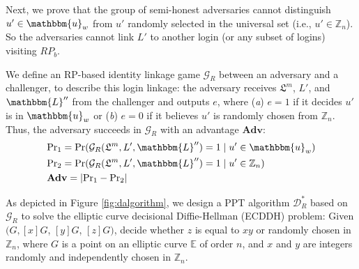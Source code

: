 Next, we prove that the group of semi-honest adversaries cannot distinguish $u' \in \mathbbm{u}_w$ from $u'$ randomly selected in the universal set (i.e., $u' \in \mathbb{Z}_n$).
So the adversaries cannot link $L'$ to another login (or any subset of logins) visiting $RP_{b}$.


We define an RP-based identity linkage game $\mathcal{G}_R$ between an adversary and a challenger, to describe this login linkage: the adversary receives $\mathfrak{L}^m$, $L'$, and $\mathbbm{L}''$ from the challenger and outputs $e$, where (\emph{a}) $e = 1$ if it decides $u'$ is in $\mathbbm{u}_w$ %
or (\emph{b}) $e=0$ if it believes $u'$ is randomly chosen from $\mathbb{Z}_n$.
Thus, the adversary succeeds in $\mathcal{G}_R$ with an advantage $\mathbf{Adv}$:
\begin{align*}
&{\rm Pr}_1={\rm Pr}(\mathcal{G}_R(\mathfrak{L}^m, L', \mathbbm{L}'')=1 \;| \; u' \in \mathbbm{u}_w)  \\
&{\rm Pr}_2={\rm Pr}(\mathcal{G}_R(\mathfrak{L}^m, L', \mathbbm{L}'')=1 \; | \; u' \in \mathbb{Z}_n)\\
&{\mathbf{Adv}}=|{\rm Pr}_1-{\rm Pr}_2|
\end{align*}

As depicted in Figure \ref{fig:dalgorithm}, we design a PPT algorithm $\mathcal{D}^*_R$ based on $\mathcal{G}_R$ to solve the elliptic curve decisional Diffie-Hellman (ECDDH) problem: Given $(G, [x]G$, $[y]G$, $[z]G)$, decide whether $z$ is equal to $xy$ or randomly chosen in $\mathbb{Z}_n$, where $G$ is a point on an elliptic curve $\mathbb{E}$ of order $n$, and $x$ and $y$ are integers randomly and independently chosen in $\mathbb{Z}_n$.


